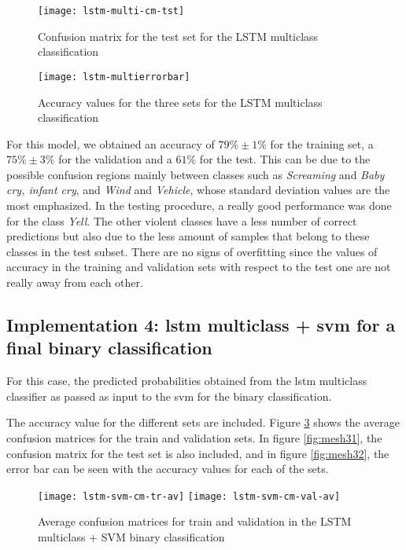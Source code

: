 	\begin{figure}[t]
		\centering
		\captionsetup{justification=centering}
		\texttt{[image: lstm-multi-cm-tst]}
		\caption{Confusion matrix for the test set for the LSTM multiclass classification}
		\label{fig:mesh28}
	\end{figure}
	
	\begin{figure}[t]
		\centering
		\captionsetup{justification=centering}
		\texttt{[image: lstm-multierrorbar]}
		\caption{Accuracy values for the three sets for the LSTM multiclass classification}
		\label{fig:mesh29}
	\end{figure}

	For this model, we obtained an accuracy of $79\% \pm 1\%$ for the training set, a $75\% \pm 3\%$ for the validation and a $61\%$ for the test. This can be due to the possible confusion regions mainly between classes such as \textit{Screaming} and \textit{Baby cry, infant cry}, and \textit{Wind} and \textit{Vehicle}, whose standard deviation values are the most emphasized. In the testing procedure, a really good performance was done for the class \textit{Yell}. The other violent classes have a less number of correct predictions but also due to the less amount of samples that belong to these classes in the test subset. There are no signs of overfitting since the values of accuracy in the training and validation sets with respect to the test one are not really away from each other.
	
\subsection{Implementation 4: \acrshort{lstm} multiclass + \acrshort{svm} for a final binary classification}
	
	For this case, the predicted probabilities obtained from the \acrshort{lstm} multiclass classifier as passed as input to the \acrshort{svm} for the binary classification. 
	
	The accuracy value for the different sets are included. Figure \ref{fig:mesh30} shows the average confusion matrices for the train and validation sets. In figure \ref{fig:mesh31}, the confusion matrix for the test set is also included, and in figure \ref{fig:mesh32}, the error bar can be seen with the accuracy values for each of the sets.
	
	\begin{figure}[t]
		\centering
		\captionsetup{justification=centering}
		\texttt{[image: lstm-svm-cm-tr-av]}%
		\texttt{[image: lstm-svm-cm-val-av]}	
		\caption{Average confusion matrices for train and validation in the LSTM multiclass + SVM binary classification}
		\label{fig:mesh30}
	\end{figure}
	
